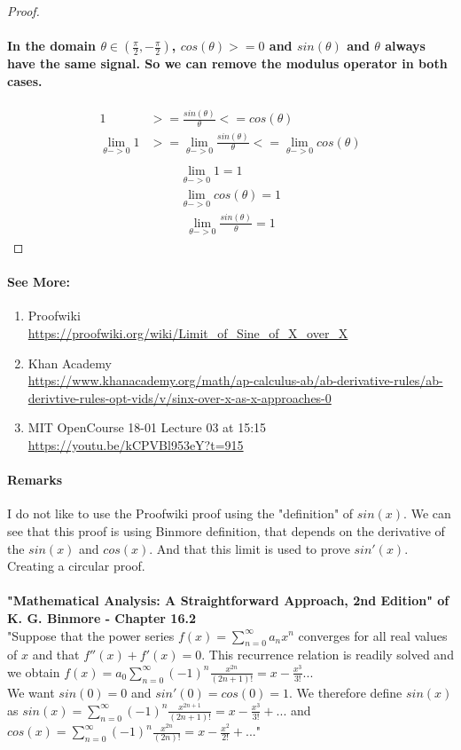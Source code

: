 \documentclass{article}
\theoremstyle{definition}
\begin{document}
\begin{proof}
	\paragraph{In the domain $\theta \in (\frac{\pi}{2},-\frac{\pi}{2})$, $cos(\theta) >= 0$ and $sin(\theta)$ and $\theta$ always have the same signal. So we can remove the modulus operator in both cases.}
	\begin{align*}
		1 &>=  \frac{sin(\theta)}{\theta} <= cos(\theta)\\
		\lim_{\theta->0}{1} &>= \lim_{\theta->0}{\frac{sin(\theta)}{\theta}} <= \lim_{\theta->0}{cos(\theta)}\\
	\end{align*}
	\begin{align*}
		\lim_{\theta->0}{1} = 1\\
		\lim_{\theta->0}{cos(\theta)} = 1
	\end{align*}
	\begin{align*}
		\lim_{\theta->0}{\frac{sin(\theta)}{\theta}} = 1
	\end{align*}
\end{proof}
\paragraph{See More:}
\begin{enumerate}
	\item {Proofwiki \\
\url{https://proofwiki.org/wiki/Limit_of_Sine_of_X_over_X}}
	\item {Khan Academy\\
\url{https://www.khanacademy.org/math/ap-calculus-ab/ab-derivative-rules/ab-derivtive-rules-opt-vids/v/sinx-over-x-as-x-approaches-0}}
	\item {MIT OpenCourse 18-01 Lecture 03 at 15:15\\
	\url{https://youtu.be/kCPVBl953eY?t=915}}
\end{enumerate}
\paragraph{Remarks} I do not like to use the Proofwiki proof using the "definition" of $sin(x)$. We can see that this proof is using Binmore definition, that depends on the derivative of the $sin(x)$ and $cos(x)$. And that this limit is used to prove $sin'(x)$. Creating a circular proof.
\\
\\
\textbf{"Mathematical Analysis: A Straightforward Approach, 2nd Edition" of K. G. Binmore - Chapter 16.2}\\
"Suppose that the power series $f(x) = \sum_{n=0}^{\infty}{a_nx^n}$
converges for all real values of $x$ and that $f''(x) + f'(x) = 0$.
This recurrence relation is readily solved and we obtain
$f(x) = a_0 \sum_{n=0}^{\infty}{(-1)^n \frac{x^{2n}}{(2n+1)!}} = x - \frac{x^3}{3!} ...$\\
We want $sin(0) = 0$ and $ sin'(0) = cos(0) = 1$. We therefore define $sin(x)$ as
$ sin(x) = \sum_{n=0}^{\infty}{(-1)^n \frac{x^{2n+1}}{(2n+1)!} = x - \frac{x^3}{3!} + ... } $ and
$ cos(x) = \sum_{n=0}^{\infty}{(-1)^n \frac{x^{2n}}{(2n)!} = x - \frac{x^2}{2!} + ... } $"
\end{document}

